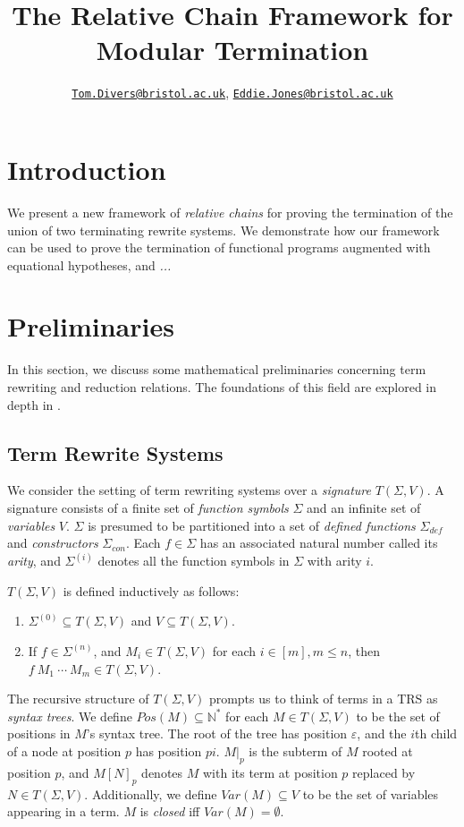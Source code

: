 \documentclass{article}
\title{The Relative Chain Framework for Modular Termination}
\author{\href{mailto:oi24939@bristol.ac.uk}{\texttt{Tom.Divers@bristol.ac.uk}}, \href{mailto:eddie.jones@bristol.ac.uk}{\texttt{Eddie.Jones@bristol.ac.uk}}}
\date{}
\theoremstyle{definition}
\begin{document}
\maketitle

\section{Introduction}

We present a new framework of \emph{relative chains} for proving the termination of the union of two terminating rewrite systems. We demonstrate how our framework can be used to prove the termination of functional programs augmented with equational hypotheses, and \emph{...}

\section{Preliminaries}

In this section, we discuss some mathematical preliminaries concerning term rewriting and reduction relations. The foundations of this field are explored in depth in \cite{baader1998terms}.

\subsection{Term Rewrite Systems}

We consider the setting of term rewriting systems over a \emph{signature} $T(\Sigma, V)$. A signature consists of a finite set of \emph{function symbols} $\Sigma$ and an infinite set of \emph{variables} $V$. $\Sigma$ is presumed to be partitioned into a set of \emph{defined functions} $\Sigma_{def}$ and \emph{constructors} $\Sigma_{con}$. Each $f \in \Sigma$ has an associated natural number called its \emph{arity}, and $\Sigma^{(i)}$ denotes all the function symbols in $\Sigma$ with arity $i$.

$T(\Sigma, V)$ is defined inductively as follows: \begin{enumerate}
    \item $\Sigma^{(0)} \subseteq T(\Sigma, V)$ and $V \subseteq T(\Sigma, V)$. 
    \item If $f \in \Sigma^{(n)}$, and $M_i \in T(\Sigma, V)$ for each $i \in [m], m \leq n$, then $f ~ M_1 ~ \cdots ~ M_m \in T(\Sigma, V)$. 
\end{enumerate}

The recursive structure of $T(\Sigma, V)$ prompts us to think of terms in a TRS as \emph{syntax trees}. We define $Pos(M) \subseteq \mathbb{N}^*$ for each $M \in T(\Sigma, V)$ to be the set of positions in $M$'s syntax tree. The root of the tree has position $\varepsilon$, and the $i$th child of a node at position $p$ has position $pi$. $M|_p$ is the subterm of $M$ rooted at position $p$, and $M[N]_p$ denotes $M$ with its term at position $p$ replaced by $N \in T(\Sigma, V)$. Additionally, we define $Var(M) \subseteq V$ to be the set of variables appearing in a term. $M$ is \emph{closed} iff $Var(M) = \emptyset$. 
\end{document}
